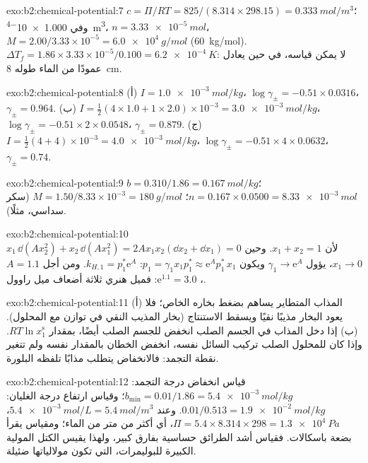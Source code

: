 \begin{solution}{exo:b2:chemical-potential:7}
$c = \Pi/RT = 825/(8.314 \times 298.15) = \qty{0.333}{mol/m^3}$؛ وفي
\qty{1.000e-4}{m^3}، $n = \qty{3.33e-5}{mol}$، $M = 2.00/3.33 \times 10^{-5}
= \qty{6.0e4}{g/mol}$ (\qty{60}{kg/mol}). $\Delta T_f = 1.86 \times 3.33
\times 10^{-5}/0.100 = \qty{6.2e-4}{K}$: لا يمكن قياسه، في حين يعادل  عمودًا من الماء طوله \qty{8}{cm}.
\end{solution}

\begin{solution}{exo:b2:chemical-potential:8}
(أ) $I = \qty{1.0e-3}{mol/kg}$، $\log\gamma_\pm = -0.51 \times 0.0316$،
$\gamma_\pm = 0.964$. (ب) $I = \frac12(4 \times 1.0 + 1 \times 2.0) \times
10^{-3} = \qty{3.0e-3}{mol/kg}$، $\log\gamma_\pm = -0.51 \times 2 \times 0.0548$،
$\gamma_\pm = 0.879$. (ج) $I = \frac12(4 + 4) \times 10^{-3} = \qty{4.0e-3}{mol/kg}$،
$\log\gamma_\pm = -0.51 \times 4 \times 0.0632$، $\gamma_\pm = 0.74$.
\end{solution}

\begin{solution}{exo:b2:chemical-potential:9}
$b = 0.310/1.86 = \qty{0.167}{mol/kg}$؛ $n = 0.167 \times 0.0500 =
\qty{8.33e-3}{mol}$؛ $M = 1.50/8.33 \times 10^{-3} = \qty{180}{g/mol}$ (سكر
سداسي، مثلًا).
\end{solution}

\begin{solution}{exo:b2:chemical-potential:10}
$x_1\,\dd(Ax_2^2) + x_2\,\dd(Ax_1^2) = 2Ax_1x_2(\dd x_2 + \dd x_1) = 0$ لأن
$x_1 + x_2 = 1$. وحين $x_1 \to 0$، يؤول $\gamma_1 \to \mathrm e^{A}$ ويكون $p_1 =
\gamma_1x_1p_1^* \approx \mathrm e^{A}p_1^*\,x_1$: $k_{H,1} = p_1^*\mathrm e^A$.
ومن أجل $A = 1.1$، $\mathrm e^{1.1} = 3.0$: فميل هنري ثلاثة أضعاف ميل راوول.
\end{solution}

\begin{solution}{exo:b2:chemical-potential:11}
(أ) المذاب المتطاير يساهم بضغط بخاره الخاص؛ فلا يعود البخار مذيبًا نقيًا
ويسقط الاستنتاج (بخار المذيب النقي في توازن مع المحلول). (ب) إذا دخل
المذاب في الجسم الصلب انخفض  للجسم الصلب أيضًا، بمقدار
$RT\ln x_1^{\text{s}}$. وإذا كان للمحلول الصلب تركيب السائل نفسه، انخفض
الخطان بالمقدار نفسه ولم تتغير نقطة التجمد: فالانخفاض يتطلب مذابًا
تلفظه البلورة.
\end{solution}

\begin{solution}{exo:b2:chemical-potential:12}
قياس انخفاض درجة التجمد: $b_{\min} = 0.01/1.86 = \qty{5.4e-3}{mol/kg}$؛ وقياس ارتفاع درجة الغليان:
$0.01/0.513 = \qty{1.9e-2}{mol/kg}$. وعند $\qty{5.4e-3}{mol/L} =
\qty{5.4}{mol/m^3}$، $\Pi = 5.4 \times 8.314 \times 298 = \qty{1.3e4}{Pa}$،
أي أكثر من متر من الماء؛ ومقياس  يقرأ بضعة باسكالات. فقياس 
أشد الطرائق حساسية بفارق كبير، ولهذا يقيس الكتل المولية الكبيرة
للبوليمرات، التي تكون مولالياتها ضئيلة.
\end{solution}

